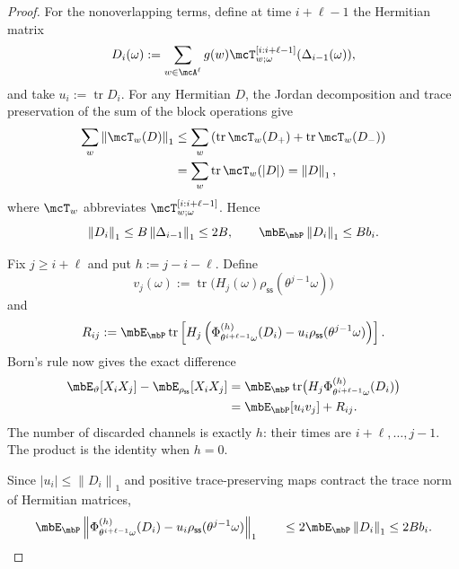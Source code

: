 \documentclass[10pt,a4paper]{amsart}
\numberwithin{equation}{section}   %
\theoremstyle{plain}   %
\theoremstyle{plain}   %
\theoremstyle{examplestyle}
\DeclareMathOperator{\pr}{\mbP}           %
\newcommand{\s}{\rho_{\mathsf{ss}}}     %
\DeclareMathOperator{\str}{tr} %
\newcommand{\unorm}[1]{\left\lVert#1\right\rVert}
\begin{document}
\begin{proof}
    For the nonoverlapping terms, define at time $i+\ell-1$ the Hermitian matrix
    \[
        D_i(\omega)
        :=
        \sum_{w\in\mcA^\ell}
            g(w)
            \mcT^{[i:i+\ell-1]}_{w;\omega}
                (\Delta_{i-1}(\omega)),
    \]
    and take $u_i:=\str D_i$. 
    For any Hermitian $D$, the Jordan decomposition and trace preservation of the sum of the block operations give
    \[
        \begin{aligned}
            \sum_w\unorm{\mcT_w(D)}_1
            &\le
            \sum_w
                \left(
                    \str\mcT_w(D_+)
                    +
                    \str\mcT_w(D_-)
                \right)\\
            &=
            \sum_w\str\mcT_w(|D|)
            =
            \unorm D_1,
        \end{aligned}
    \]
    where $\mcT_w$ abbreviates  $\mcT^{[i:i+\ell-1]}_{w;\omega}$.
    Hence
    \[
        \unorm{D_i}_1
        \le B\unorm{\Delta_{i-1}}_1
        \le2B,
        \qquad
        \mbE_{\pr}\unorm{D_i}_1\le Bb_i.
    \]

    Fix $j\ge i+\ell$ and put $h:=j-i-\ell$.
    Define
    \[
        v_j(\omega)
        :=
        \str\bigl(
            H_j(\omega)\s(\theta^{j-1}\omega)
        \bigr)
    \]
    and
    \[
        R_{ij}
        :=
        \mbE_{\pr}\str\left[
            H_j
            \left(
                \Phi^{(h)}_{\theta^{i+\ell-1}\omega}(D_i)
                -
                u_i\s(\theta^{j-1}\omega)
            \right)
        \right].
    \]
    Born's rule now gives the exact difference
    \begin{align}
    \label{univ:eq:pairdifference}
        \mbE_\vartheta[X_iX_j]
        -
        \mbE_{\s}[X_iX_j]
        &=
        \mbE_{\pr}\str\bigl(
            H_j
            \Phi^{(h)}_{\theta^{i+\ell-1}\omega}(D_i)
        \bigr)
        \nonumber\\
        &=
        \mbE_{\pr}[u_i v_j]+R_{ij}.
    \end{align}
    The number of discarded channels is exactly $h$: their times are $i+\ell,\ldots,j-1$.
    The product is the identity when $h=0$.

    Since $|u_i|\le\unorm{D_i}_1$ and positive trace-preserving maps contract the trace norm of
    Hermitian matrices,
    \[
        \mbE_{\pr}
        \unorm{
            \Phi^{(h)}_{\theta^{i+\ell-1}\omega}(D_i)
            -
            u_i\s(\theta^{j-1}\omega)
        }_1
        \qquad\le
        2\mbE_{\pr}\unorm{D_i}_1
        \le2Bb_i.
    \]


\end{proof}
\end{document}
